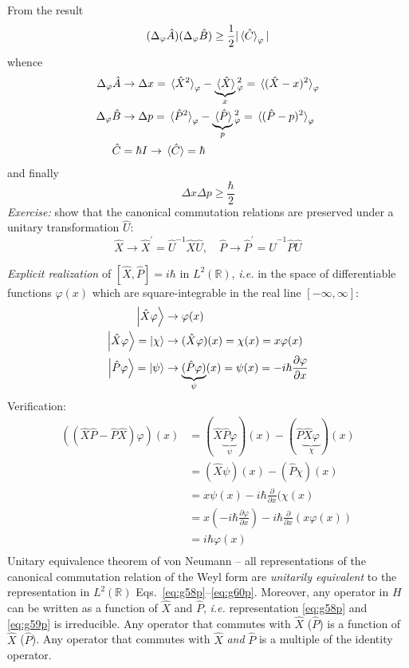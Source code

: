 \documentclass[12pt]{article}
\newcommand{\be}{\begin{equation}}
\newcommand{\ee}{\end{equation}}
\begin{document}
From the result
\be
(\Delta_\varphi \hat{A})(\Delta_\varphi \hat{B})
\geq \frac{1}{2} |\ev*{\hat{C}}_\varphi|
\ee
whence
\[
\begin{aligned}
\Delta_\varphi \hat{A} 
&\to \Delta x = \ev*{\hat{X}^2}_\varphi - 
\underbrace{\ev*{\hat{X}}}%
_{x}{^2_\varphi} = \ev*{(\hat{X}-x)^2}_\varphi\\
\Delta_\varphi \hat{B} 
&\to \Delta p = \ev*{\hat{P}^2}_\varphi - 
\underbrace{\ev*{\hat{P}}}%
_{p}{^2_\varphi} = \ev*{(\hat{P}-p)^2}_\varphi\\
\hat{C} 
&= \hbar I \to \ev*{\hat{C}} = \hbar
\end{aligned}
\]
and finally
\be
\boxed{\Delta x \Delta p \geq \frac{\hbar}{2}}
\ee
\emph{Exercise:} show that the canonical commutation
relations are preserved under a unitary transformation $\hat{U}$:
\be
\hat{X} \to \hat{X}^\prime = \hat{U}^{-1}\hat{X}\hat{U},\quad
\hat{P} \to \hat{P}^\prime = \hat{U}^{-1}\hat{P}\hat{U}
\ee


\emph{Explicit realization} of $[\hat{X},\hat{P}] = i\hbar$ in $L^{2}(\mathbb{R})$, \textit{i.e.}
in the space of differentiable functions $\varphi(x)$ which are
square-integrable in the real line $[-\infty,\infty]$:
\begin{align}
\ket{\hat{X}\varphi} 
&\to \varphi(x) \label{eq:g58p}\\
\ket{\hat{X}\varphi} = \ket{\chi} 
&\to (\hat{X}\varphi)(x) = \chi(x) = x\varphi(x)\label{eq:g59p}\\
\ket{\hat{P}\varphi} = \ket{\psi} 
&\to \underbrace{(\hat{P}\varphi)}_{\psi}(x) = \psi(x)
= -i\hbar\frac{\partial\varphi}{\partial x}\label{eq:g60p}
\end{align}
%
Verification:
%
\be
\begin{aligned}
\left(
(\hat{X}\hat{P}-\hat{P}\hat{X})\varphi
\right)(x)
&=(\hat{X}\underbrace{\hat{P}\varphi}_{\psi})(x) - (\hat{P}\underbrace{\hat{X}\varphi}_{\chi})(x)\\
&=(\hat{X}\psi)(x) - (\hat{P}\chi)(x)\\
&=x\psi(x) - i\hbar\frac{\partial}{\partial x}(\chi(x)\\
&=x\left(- i\hbar\frac{\partial\varphi}{\partial x}\right) - 
i\hbar\frac{\partial}{\partial x}\left(x\varphi(x)\right)\\
&=i\hbar\varphi(x)\\
\end{aligned}
\ee
%
Unitary equivalence theorem of von Neumann
-- all representations of the canonical commutation
relation of the Weyl form are \emph{unitarily equivalent}
to the representation in $L^{2}(\mathbb{R})$ 
Eqs.~\eqref{eq:g58p}--\eqref{eq:g60p}.
Moreover, any operator in $H$ can be written as a
function of $\hat{X}$ and $\hat{P}$, \textit{i.e.} representation \eqref{eq:g58p} and
\eqref{eq:g59p} is irreducible. Any operator that commutes
with $\hat{X}$ ($\hat{P}$) is a function of $\hat{X}$ ($\hat{P}$). Any operator that commutes with $\hat{X}$ \emph{and} $\hat{P}$ is a multiple 
of the identity operator.
\end{document}
